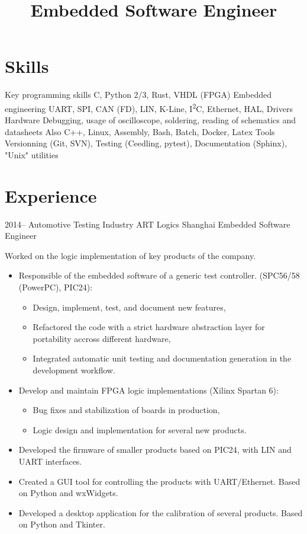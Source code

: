 \documentclass[11pt,a4paper,sans]{moderncv}        %
\title{Embedded Software Engineer}
\begin{document}
\makecvtitle

\section{Skills}
\cvitem
  {Key programming skills}
  {C, Python 2/3, Rust, VHDL (FPGA)}
\cvitem
  {Embedded engineering}
  {UART, SPI, CAN (FD), LIN, K-Line, I\textsuperscript{2}C, Ethernet, HAL, Drivers}
\cvitem
  {Hardware}
  {Debugging, usage of oscilloscope, soldering, reading of schematics and datasheets}
\cvitem
  {Also}
  {C++, Linux, Assembly, Bash, Batch, Docker, Latex}
\cvitem
  {Tools}
  {Versionning (Git, SVN), Testing (Ceedling, pytest), Documentation (Sphinx), "Unix" utilities}

\section{Experience}
\cventry
  {2014--\the\year}
  {Automotive Testing Industry}
  {ART Logics}
  {Shanghai}
  {Embedded Software Engineer}
  {
    Worked on the logic implementation of key products of the company.
    \begin{itemize}%
    \item Responsible of the embedded software of a generic test controller. (SPC56/58 (PowerPC), PIC24):
      \begin{itemize}%
      \item Design, implement, test, and document new features,
      \item Refactored the code with a strict hardware abstraction layer for portability accross different hardware,
      \item Integrated automatic unit testing and documentation generation in the development workflow.
      \end{itemize}
    \item Develop and maintain FPGA logic implementations (Xilinx Spartan 6):
      \begin{itemize}%
      \item Bug fixes and stabilization of boards in production,
      \item Logic design and implementation for several new products.
      \end{itemize}
    \item Developed the firmware of smaller products based on PIC24, with LIN and UART interfaces.
    \item Created a GUI tool for controlling the products with UART/Ethernet. Based on Python and wxWidgets.
    \item Developed a desktop application for the calibration of several products. Based on Python and Tkinter.
    \end{itemize}
  }
\end{document}
